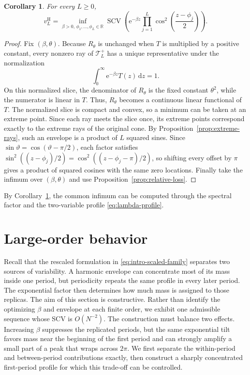 \documentclass[11pt]{article}
\numberwithin{equation}{section}
\newtheorem{corollary}[theorem]{Corollary}
\theoremstyle{remark}
\newcommand{\R}{\mathbb R}
\newcommand{\SCV}{\operatorname{SCV}}
\newcommand{\e}{\mathrm e}
\newcommand{\dd}{\,\mathrm d}
\newcommand{\Tcal}{\mathcal T}
\newcommand{\vH}{v^{\mathrm H}}
\begin{document}
\begin{corollary}
\label{cor:cosine-equivalence}
For every $L\geq0$,
\[
  \vH_L
  =\inf_{\beta>0,\,\phi_1,\ldots,\phi_L\in\R}
  \SCV\!\left(
    \e^{-\beta z}\prod_{j=1}^{L}
    \cos^2\!\left(\frac{z-\phi_j}{2}\right)
  \right).
\]
\end{corollary}

\begin{proof}
Fix $(\beta,\theta)$. Because $R_\theta$ is unchanged when $T$ is multiplied by a positive constant, every nonzero ray of $\Tcal_L^+$ has a unique representative under the normalization
\[
  \int_0^\infty \e^{-\beta z}T(z)\dd z=1.
\]
On this normalized slice, the denominator of $R_\theta$ is the fixed constant $\theta^2$, while the numerator is linear in $T$. Thus, $R_\theta$ becomes a continuous linear functional of $T$. The normalized slice is compact and convex, so a minimum can be taken at an extreme point. Since each ray meets the slice once, its extreme points correspond exactly to the extreme rays of the original cone. By Proposition~\ref{prop:extreme-rays}, such an envelope is a product of $L$ squared sines. Since $\sin\vartheta=\cos(\vartheta-\pi/2)$, each factor satisfies $\sin^2((z-\phi_j)/2)=\cos^2((z-\phi_j-\pi)/2)$, so shifting every offset by $\pi$ gives a product of squared cosines with the same zero locations. Finally take the infimum over $(\beta,\theta)$ and use Proposition~\ref{prop:relative-loss}.
\end{proof}

By Corollary~\ref{cor:cosine-equivalence}, the common infimum can be computed through the spectral factor and the two-variable profile \eqref{eq:lambda-profile}.

\section{Large-order behavior}\label{sec:asymptotics}
Recall that the rescaled formulation in \eqref{eq:intro-scaled-family} separates two sources of variability. A harmonic envelope can concentrate most of its mass inside one period, but periodicity repeats the same profile in every later period. The exponential factor then determines how much mass is assigned to those replicas. The aim of this section is constructive. Rather than identify the optimizing $\beta$ and envelope at each finite order, we exhibit one admissible sequence whose SCV is $O(N^{-2})$. The construction must balance two effects. Increasing $\beta$ suppresses the replicated periods, but the same exponential tilt favors mass near the beginning of the first period and can strongly amplify a small part of a peak that wraps across $2\pi$. We first separate the within-period and between-period contributions exactly, then construct a sharply concentrated first-period profile for which this trade-off can be controlled.
\end{document}

